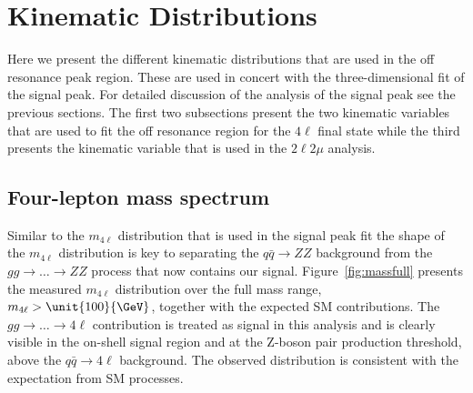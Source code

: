 \section{Kinematic Distributions}
\label{sec:Width_Kin_Dists}

Here we present the different kinematic distributions that are used in the off resonance peak region. These are used in concert with the three-dimensional fit of the signal peak. For detailed discussion of the analysis of the signal peak see the previous sections. The first two subsections present the two kinematic variables that are used to fit the off resonance region for the $4\ell$ final state while the third presents the kinematic variable that is used in the $2\ell2\mu$ analysis.

\subsection{Four-lepton mass spectrum}
\label{sec:width_m4l_spectrum}

Similar to the $m_{4\ell}$ distribution that is used in the signal peak fit the shape of the $m_{4\ell}$ distribution is key to separating the $q\bar{q} \to ZZ$ background from the $gg \to \ldots \to ZZ$ process that now contains our signal. Figure~\ref{fig:massfull} presents the measured $m_{4\ell}$ distribution over the full mass range, $m_{4\ell} > \unit{100}{\GeV}$, together with the expected SM contributions. The $gg \to \ldots \to 4\ell$ contribution is treated as signal in this analysis and is clearly visible in the on-shell signal region and at the Z-boson pair production threshold, above the $q\bar{q} \to 4\ell$ background. The observed distribution is consistent with the expectation from SM processes.


